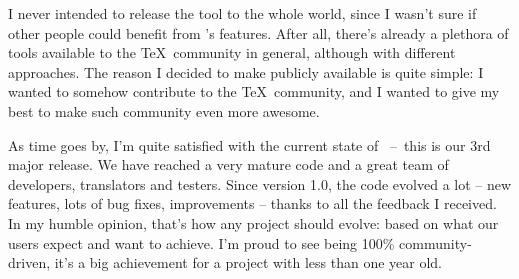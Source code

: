\documentclass[a4paper,twoside,12pt]{memoir}
\begin{document}
I never intended to release the tool to the whole world, since I wasn't sure if other people could benefit from
\arara's features. After all, there's already a plethora of tools available to the \TeX\ community in general,
although with different approaches. The reason I decided to make \arara publicly available is quite simple:
I wanted to somehow contribute to the \TeX\ community, and I wanted to give my best to make such
community even more awesome.

As time goes by, I'm quite satisfied with the current state of \arara~--~this is our 3rd major release. We
have reached a very mature code and a great team of developers, translators and testers. Since version 1.0,
the code evolved a lot -- new features, lots of bug fixes, improvements -- thanks to all the feedback I
received. In my humble opinion, that's how any project should evolve: based on what our users expect and
want to achieve. I'm proud to see \arara being 100\% community-driven, it's a big achievement for a project
with less than one year old.
\end{document}
